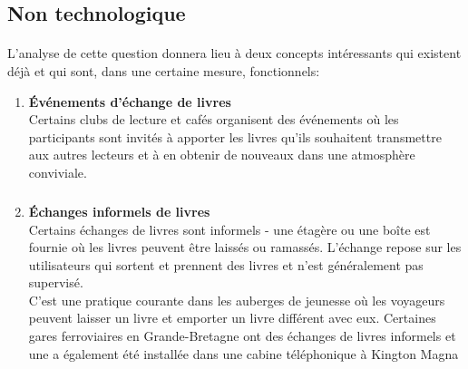 \subsection{Non technologique}
\paragraph{}
L'analyse de cette question donnera lieu à deux concepts intéressants qui existent déjà et qui sont, dans une certaine mesure, fonctionnels:
\begin{enumerate}
\item \textbf{Événements d'échange de livres}\\
\tab Certains clubs de lecture et cafés organisent des événements où les participants sont invités à apporter les livres qu'ils souhaitent transmettre aux autres lecteurs et à en obtenir de nouveaux dans une atmosphère conviviale.
\subparagraph*{}
\subparagraph{}
\medskip \item \textbf{Échanges informels de livres}\\
\tab Certains échanges de livres sont informels - une étagère ou une boîte est fournie où les livres peuvent être laissés ou ramassés. L'échange repose sur les utilisateurs qui sortent et prennent des livres et n'est généralement pas supervisé.\\
\tab C'est une pratique courante dans les auberges de jeunesse où les voyageurs peuvent laisser un livre et emporter un livre différent avec eux. Certaines gares ferroviaires en Grande-Bretagne ont des échanges de livres informels et une a également été installée dans une cabine téléphonique à Kington Magna

\end{enumerate}
